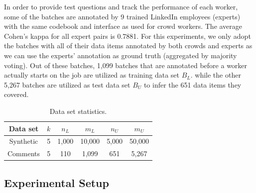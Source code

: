 In order to provide test questions and track the performance of each worker, 
some of the batches are annotated by 9 trained LinkedIn employees (experts) with the same codebook and interface as used for crowd workers.  
The average Cohen's kappa for all expert pairs is 0.7881.  
For this experiments, we only adopt the batches with all of their data items annotated by both crowds and experts 
as we can use the experts' annotation as ground truth (aggregated by majority voting).  
Out of these batches, 1,099 batches that are annotated before a worker actually starts on the job 
are utilized as training data set $B_L$.  
while the other 5,267 batches are utilized as test data set $B_U$ to infer the 651 data items they covered.  


\begin{table}[!t]
\centering
 {\caption{Data set statistics.}\label{tab:dataset}}
{
  \begin{tabular}{c||c|c|c|c|c}
  \hline
  Data set & $k$ & $n_L$  &  $m_L$ & $n_U$  & $m_U$ \\ \hline \hline
 Synthetic & 5 & 1,000 & 10,000 & 5,000 & 50,000 \\ \hline 
 Comments  & 5 & 110   & 1,099  & 651   & 5,267  \\ \hline  
  \end{tabular}
}
\end{table}


\subsection{Experimental Setup}

